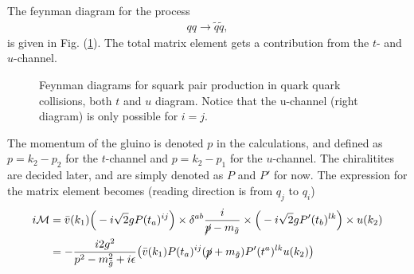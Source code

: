 \documentclass[11pt]{article}
\begin{document}
\begin{flushleft}
The feynman diagram for the process 
\begin{align*}
qq \rightarrow \tilde{q} \tilde{q},
\end{align*}
is given in Fig. (\ref{fig::Feynman qq}). The total matrix element gets a contribution from the $t$- and $u$-channel.
\begin{figure}[H]
\centering
{}
\caption{Feynman diagrams for squark pair production in quark quark collisions, both $t$ and $u$ diagram. Notice that the u-channel (right diagram) is only possible for $i=j$.}
\label{fig::Feynman qq}
\end{figure}
The momentum of the gluino is denoted $p$ in the calculations, and defined as $p= k_2-p_2 $ for the $t$-channel and $p=k_2-p_1$ for the $u$-channel. The chiralitites are decided later, and are simply denoted as $P$ and $P'$ for now. The expression for the matrix element becomes (reading direction is from $q_j$ to $q_i$)
\begin{align*}
i \mathcal{M} &= \bar{v} (k_1) \Big( -i \sqrt{2} g P (t_a)^{ij}\Big) \times \delta^{ab} \frac{i}{\cancel{p} - m_{\tilde{g}}} \times \Big( -i \sqrt{2} gP'(t_b)^{lk} \Big) \times u(k_2)\\
&= - \frac{i 2 g^2}{p^2 - m_{\tilde{g}}^2 + i \epsilon}\big( \bar{v} (k_1)  P (t_a)^{ij}(\cancel{p} + m_{\tilde{g}}) P'(t^a)^{lk} u(k_2) \big)\\

\end{align*}
\end{flushleft}
\end{document}
